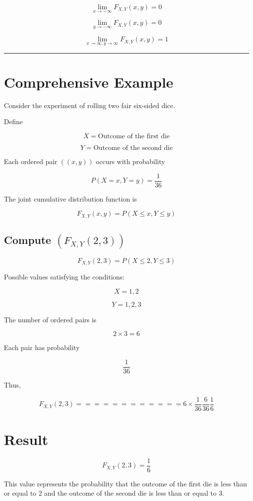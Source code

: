 \documentclass[12pt]{article}
\begin{document}
\[
\lim_{x \to -\infty} F_{X,Y}(x,y) = 0
\]

\[
\lim_{y \to -\infty} F_{X,Y}(x,y) = 0
\]

\[
\lim_{x \to \infty, y \to \infty} F_{X,Y}(x,y) = 1
\]

\hrule
\vspace{0.5cm}

\section*{Comprehensive Example}

Consider the experiment of rolling two fair six-sided dice.

Define

\[
X = \text{Outcome of the first die}
\]

\[
Y = \text{Outcome of the second die}
\]

Each ordered pair $((x,y))$ occurs with probability

\[
P(X=x,Y=y)=\frac{1}{36}
\]

The joint cumulative distribution function is

\[
F_{X,Y}(x,y)=P(X \le x, Y \le y)
\]

\subsection*{Compute $(F_{X,Y}(2,3))$}

\[
F_{X,Y}(2,3)=P(X \le 2, Y \le 3)
\]

Possible values satisfying the conditions:

\[
X = 1,2
\]

\[
Y = 1,2,3
\]

The number of ordered pairs is

\[
2 \times 3 = 6
\]

Each pair has probability

\[
\frac{1}{36}
\]

Thus,

\[
F_{X,Y}(2,3)
============

6 \times \frac{1}{36}

\frac{6}{36}

\frac{1}{6}
\]

\section*{Result}

\[
F_{X,Y}(2,3) = \frac{1}{6}
\]

This value represents the probability that the outcome of the first die is less than or equal to 2 and the outcome of the second die is less than or equal to 3.
\end{document}
